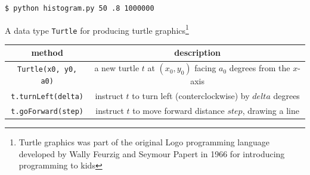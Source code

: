 \documentclass[8pt,a4paper,compress]{beamer}
\begin{document}
\begin{frame}[fragile]
\pause
\bigskip

\begin{minipage}{200pt}
\begin{lstlisting}[language={}]
$ python histogram.py 50 .8 1000000
\end{lstlisting}
\end{minipage}%
\hfill
\begin{minipage}{100pt}
\begin{center}
\end{center}
\end{minipage}%
\end{frame}

\begin{frame}[fragile]
\pause

A data type \lstinline{Turtle} for producing turtle graphics\footnote{Turtle graphics was part of the original Logo programming language developed by Wally Feurzig and Seymour Papert in 1966 for introducing programming to kids}
\begin{center}
\begin{tabular}{cc}
method & description \\ \hline
\lstinline$Turtle(x0, y0, a0)$ & a new turtle $t$ at $(x_0, y_0)$ facing $a_0$ degrees from the $x$-axis \\
\lstinline$t.turnLeft(delta)$ & instruct $t$ to turn left (conterclockwise) by $delta$ degrees \\
\lstinline$t.goForward(step)$ & instruct $t$ to move forward distance $step$, drawing a line
\end{tabular} 
\end{center}
\end{frame}
\end{document}
